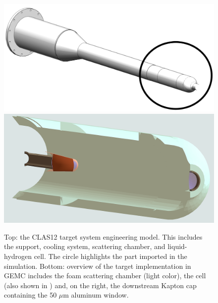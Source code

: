 \begin{figure}
	\centering
	\includegraphics[width=0.99\columnwidth,keepaspectratio]{img/targetOverview2.png}
	\includegraphics[width=0.99\columnwidth,keepaspectratio]{img/targetOverview1.png}
	\caption{Top: the CLAS12 target system engineering model. This includes the support, cooling system, scattering chamber, and
			 liquid-hydrogen cell. The circle highlights the part imported in the simulation.
			 Bottom: overview of the target implementation in GEMC includes the foam scattering chamber (light color), the
			 cell (also shown in ) and, on the right, the downstream Kapton cap containing the 50 $\mu$m aluminum window. }
	\label{fig:targetOverview}
\end{figure}





